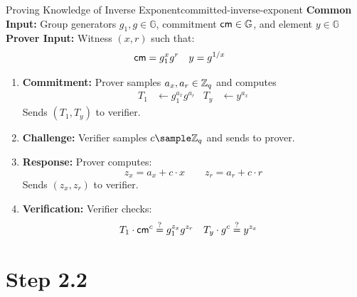 \begin{protocol}{Proving Knowledge of Inverse Exponent}{committed-inverse-exponent}\label{pok-committed-inverse-exponent}
\textbf{Common Input:} Group generators $g_1, g \in \mathbb{G}$, commitment $\mathsf{cm} \in \mathbb{G}$, and element $y \in \mathbb{G}$\\
\textbf{Prover Input:} Witness $(x, r)$ such that:
    \begin{align*}
        \mathsf{cm} &= g_1^x g^r     &    y &= g^{1/x}
    \end{align*}
\begin{enumerate}
    \item \textbf{Commitment:} Prover samples $a_x, a_r \in \mathbb{Z}_q$ and computes \\
    \begin{align*}
        T_1 &\gets g_1^{a_x} g^{a_r}  &   T_y &\gets y^{a_x}
    \end{align*}
    Sends $(T_1, T_y)$ to verifier.
    
    \item \textbf{Challenge:} Verifier samples $c \sample \mathbb{Z}_q$ and sends to prover.
    
    \item \textbf{Response:} Prover computes:
    \[
        z_x = a_x + c \cdot x \qquad z_r = a_r + c \cdot r
    \]
    Sends $(z_x, z_r)$ to verifier.
    
    \item \textbf{Verification:} Verifier checks:
    \begin{align*}
        T_1 \cdot \mathsf{cm}^c &\stackrel{?}{=} g_1^{z_x} g^{z_r}  &
        T_y \cdot g^c &\stackrel{?}{=} y^{z_x}
    \end{align*}
\end{enumerate}
\end{protocol}


\newpage
\section{Step 2.2}

